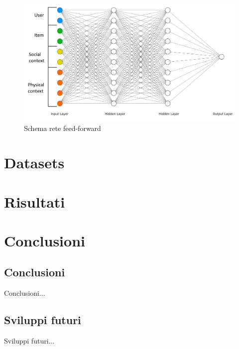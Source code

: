 \documentclass[12pt,italian]{report}
\begin{document}
\begin{figure}
  \includegraphics[width=\linewidth]{immagini/ffnet_schema.png}
  \caption{Schema rete feed-forward}
  \label{fig:ffnet_schema}
\end{figure}

% 
% 

\chapter{Datasets}
\label{chap:datasets}


% 
% 

\chapter{Risultati}
\label{chap:risultati}


% 
% 

\chapter{Conclusioni}
\label{cap6}

\section{Conclusioni}

Conclusioni...

\section{Sviluppi futuri}

Sviluppi futuri...



%
%



\nocite{*}
\end{document}
